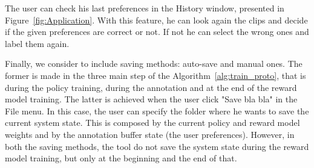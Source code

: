 The user can check his last preferences in the History window, presented in Figure\ \ref{fig:Application}. With this feature, he can look again the clips and decide if the given preferences are correct or not. If not he can select the wrong ones and label them again.

Finally, we consider to include saving methods: auto-save and manual ones. The former is made in the three main step of the Algorithm\ \ref{alg:train_proto}, that is during the policy training, during the annotation and at the end of the reward model training. The latter is achieved when the user click "Save bla bla" in the File menu. In this case, the user can specify the folder where he wants to save the current system state. This is composed by the current policy and reward model weights and by the annotation buffer state (the user preferences). However, in both the saving methods, the tool do not save the system state during the reward model training, but only at the beginning and the end of that. 